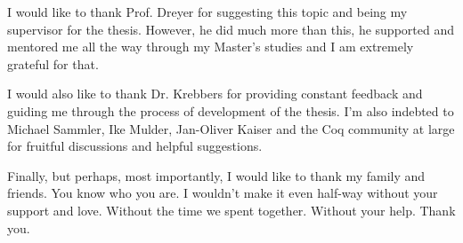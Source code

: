 I would like to thank Prof. Dreyer for suggesting this topic and being my supervisor for the thesis.
However, he did much more than this, he supported and mentored me all the way through my Master's studies and I am extremely grateful for that.

I would also like to thank Dr. Krebbers for providing constant feedback and guiding me through the process of development of the thesis.
I'm also indebted to Michael Sammler, Ike Mulder, Jan-Oliver Kaiser and the Coq community at large for fruitful discussions and helpful suggestions.

Finally, but perhaps, most importantly, I would like to thank my family and friends.
You know who you are.
I wouldn't make it even half-way without your support and love.
Without the time we spent together.
Without your help.
Thank you.


